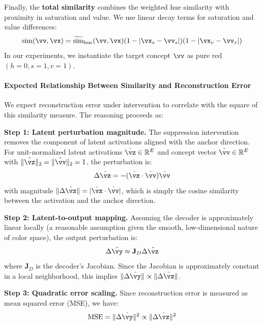 Finally, the \textbf{total similarity} combines the weighted hue similarity with proximity in saturation and value. We use linear decay terms for saturation and value differences:
\begin{equation}
    \text{sim}(\vv, \vx) = \widetilde{\text{sim}}_{\text{hue}}(\vv, \vx) (1 - |\vx_s - \vv_s|) (1 - |\vx_v - \vv_v|) \label{eq:color_similarity}
\end{equation}
In our experiments, we instantiate the target concept $\vv$ as pure red $(h=0, s=1, v=1)$.

\paragraph{Expected Relationship Between Similarity and Reconstruction Error}

We expect reconstruction error under intervention to correlate with the square of this similarity measure. The reasoning proceeds as:

\textbf{Step 1: Latent perturbation magnitude.} The suppression intervention removes the component of latent activations aligned with the  anchor direction. For unit-normalized latent activations $\hat{\vz} \in \mathbb{R}^E$ and concept vector $\hat{\vv} \in \mathbb{R}^E$ with $\|\hat{\vz}\|_2 = \|\hat{\vv}\|_2 = 1$, the perturbation is:
\begin{equation}
    \Delta \hat{\vz} = -(\hat{\vz} \cdot \hat{\vv}) \hat{\vv}
\end{equation}
with magnitude $\|\Delta \hat{\vz}\| = |\hat{\vz} \cdot \hat{\vv}|$, which is simply the cosine similarity between the activation and the anchor direction.

\textbf{Step 2: Latent-to-output mapping.} Assuming the decoder is approximately linear locally (a reasonable assumption given the smooth, low-dimensional nature of color space), the output perturbation is:
\begin{equation}
    \Delta \hat{\vy} \approx \mathbf{J}_D \Delta \hat{\vz}
\end{equation}
where $\mathbf{J}_D$ is the decoder's Jacobian. Since the Jacobian is approximately constant in a local neighborhood, this implies $\|\Delta \hat{\vy}\| \propto \|\Delta \hat{\vz}\|$.

\textbf{Step 3: Quadratic error scaling.} Since reconstruction error is measured as mean squared error (MSE), we have:
\begin{equation}
    \text{MSE} = \|\Delta \hat{\vy}\|^2 \propto \|\Delta \hat{\vz}\|^2
\end{equation}

